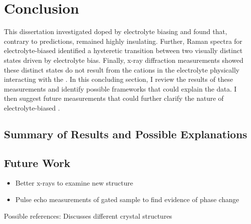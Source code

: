 \chapter{Conclusion}

This dissertation investigated \rucl doped by electrolyte biasing and found that, contrary to predictions, \rucl remained highly insulating. Further, Raman spectra for electrolyte-biased \rucl identified a hysteretic transition between two visually distinct states driven by electrolyte bias. Finally, x-ray diffraction measurements showed these distinct states do not result from the cations in the electrolyte physically interacting with the \ruclnospace . In this concluding section, I review the results of these measurements and identify possible frameworks that could explain the data. I then suggest future measurements that could further clarify the nature of electrolyte-biased \ruclnospace .

\section{Summary of Results and Possible Explanations}



\section{Future Work}
\begin{itemize}
\item Better x-rays to examine new structure
\item Pulse echo measurements of gated sample to find evidence of phase change
\end{itemize}

Possible references:
Discusses different crystal structures